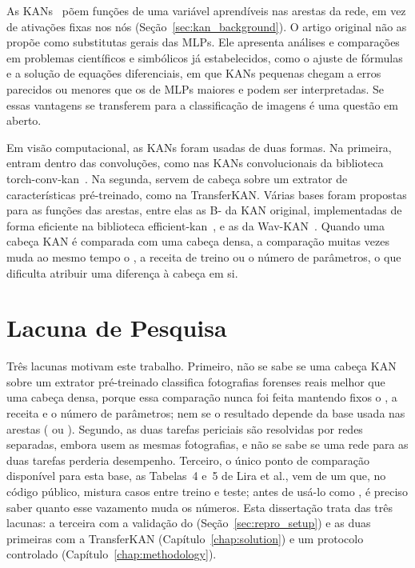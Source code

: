 As KANs~\cite{liu2024kan} põem funções de uma variável aprendíveis nas arestas da rede, em vez de ativações fixas nos nós (Seção~\ref{sec:kan_background}). O artigo original não as propõe como substitutas gerais das \glspl{MLP}. Ele apresenta análises e comparações em problemas científicos e simbólicos já estabelecidos, como o ajuste de fórmulas e a solução de equações diferenciais, em que KANs pequenas chegam a erros parecidos ou menores que os de MLPs maiores e podem ser interpretadas. Se essas vantagens se transferem para a classificação de imagens é uma questão em aberto.

Em visão computacional, as KANs foram usadas de duas formas. Na primeira, entram dentro das convoluções, como nas KANs convolucionais da biblioteca torch-conv-kan~\cite{drokin2024torchconvkan}. Na segunda, servem de cabeça sobre um extrator de características pré-treinado, como na TransferKAN. Várias bases foram propostas para as funções das arestas, entre elas as B- da KAN original, implementadas de forma eficiente na biblioteca efficient-kan~\cite{efficientkan}, e as  da Wav-KAN~\cite{bozorgasl2024wavkan}. Quando uma cabeça KAN é comparada com uma cabeça densa, a comparação muitas vezes muda ao mesmo tempo o , a receita de treino ou o número de parâmetros, o que dificulta atribuir uma diferença à cabeça em si.

\section{Lacuna de Pesquisa}
\label{sec:research_gap}

Três lacunas motivam este trabalho. Primeiro, não se sabe se uma cabeça KAN sobre um extrator pré-treinado classifica fotografias forenses reais melhor que uma cabeça densa, porque essa comparação nunca foi feita mantendo fixos o , a receita e o número de parâmetros; nem se o resultado depende da base usada nas arestas ( ou ). Segundo, as duas tarefas periciais são resolvidas por redes separadas, embora usem as mesmas fotografias, e não se sabe se uma rede para as duas tarefas perderia desempenho. Terceiro, o único ponto de comparação disponível para esta base, as Tabelas~4 e~5 de Lira et al., vem de um  que, no código público, mistura casos entre treino e teste; antes de usá-lo como , é preciso saber quanto esse vazamento muda os números. Esta dissertação trata das três lacunas: a terceira com a validação do  (Seção~\ref{sec:repro_setup}) e as duas primeiras com a TransferKAN (Capítulo~\ref{chap:solution}) e um protocolo controlado (Capítulo~\ref{chap:methodology}).

